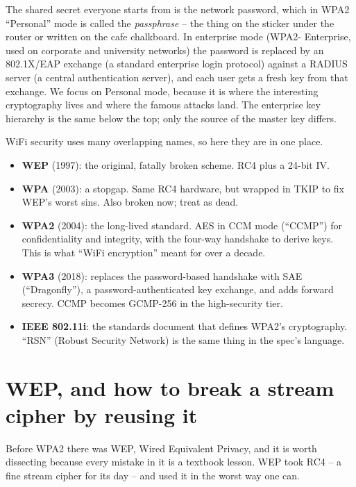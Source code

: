 The shared secret everyone starts from is the network password, which in WPA2
``Personal'' mode is called the \emph{passphrase} -- the thing on the sticker
under the router or written on the cafe chalkboard. In enterprise mode (WPA2-
Enterprise, used on corporate and university networks) the password is replaced
by an 802.1X/EAP exchange (a standard enterprise login protocol) against a RADIUS server (a central authentication server), and each user gets a fresh key
from that exchange. We focus on Personal mode, because it is where the
interesting cryptography lives and where the famous attacks land. The enterprise
key hierarchy is the same below the top; only the source of the master key
differs.

\begin{focusbox}
WiFi security uses many overlapping names, so here they are in one place.
\begin{itemize}
  \item \textbf{WEP} (1997): the original, fatally broken scheme. RC4 plus a
        24-bit IV.
  \item \textbf{WPA} (2003): a stopgap. Same RC4 hardware, but wrapped in TKIP
        to fix WEP's worst sins. Also broken now; treat as dead.
  \item \textbf{WPA2} (2004): the long-lived standard. AES in CCM mode (``CCMP'')
        for confidentiality and integrity, with the four-way handshake to derive
        keys. This is what ``WiFi encryption'' meant for over a decade.
  \item \textbf{WPA3} (2018): replaces the password-based handshake with SAE
        (``Dragonfly''), a password-authenticated key exchange, and adds
        forward secrecy. CCMP becomes GCMP-256 in the high-security tier.
  \item \textbf{IEEE 802.11i}: the standards document that defines WPA2's
        cryptography. ``RSN'' (Robust Security Network) is the same thing in the
        spec's language.
\end{itemize}

\end{focusbox}

\section{WEP, and how to break a stream cipher by reusing it}

Before WPA2 there was WEP, Wired Equivalent Privacy, and it is worth dissecting
because every mistake in it is a textbook lesson. WEP took RC4 -- a fine stream
cipher for its day -- and used it in the worst way one can.

